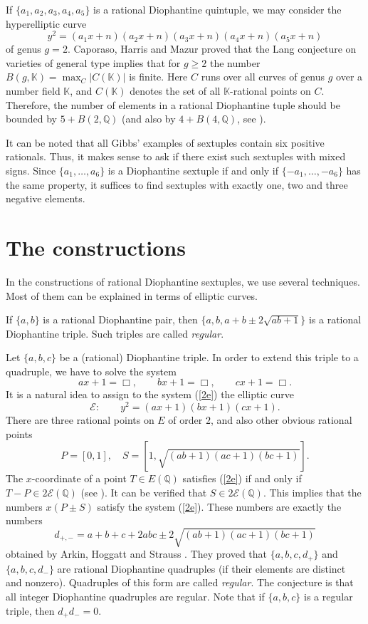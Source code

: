 \documentclass [11pt] {article}
\begin{document}
If $\{a_1,a_2,a_3,a_4,a_5\}$ is a rational Diophantine quintuple, we may consider the hyperelliptic curve
$$ y^2=(a_1x+n)(a_2x+n)(a_3x+n)(a_4x+n)(a_5x+n) $$
of genus $g=2$. Caporaso, Harris and Mazur \cite{C-H-M} proved that
the Lang conjecture on varieties of general type implies that for $g\geq 2$
the number $B(g,\mathbb{K})=\max_{C} |C(\mathbb{K})|$ is finite. Here $C$ runs over all
curves of genus $g$ over a number field $\mathbb{K}$, and $C(\mathbb{K})$ denotes the set of
all $\mathbb{K}$-rational points on $C$. Therefore, the number of elements in a rational
Diophantine tuple should be bounded by $5+B(2,\mathbb{Q})$
(and also by $4+B(4,\mathbb{Q})$, see \cite{P-H-Z}).

\medskip

It can be noted that all Gibbs' examples of sextuples contain six positive rationals.
Thus, it makes sense to ask if there exist such sextuples with mixed signs. Since
$\{a_1, \ldots, a_6\}$ is a Diophantine sextuple if and only if $\{-a_1, \ldots, -a_6\}$ has
the same property, it suffices to find sextuples with exactly one, two and three negative elements.


\section{The constructions}

In the constructions of rational Diophantine sextuples, we use several
techniques. Most of them can be explained in terms of elliptic curves.

If $\{a,b\}$ is a rational Diophantine pair,
then $\{a,b,a+b\pm 2\sqrt{ab+1}\}$ is a rational Diophantine triple.
Such triples are called \emph{regular}.

Let $\{a,b,c\}$ be a (rational) Diophantine triple. In order to extend
this triple to a quadruple, we have to solve the system
\begin{equation} \label{2e}
ax+1=\Box,\qquad bx+1=\Box,\qquad cx+1=\Box.
\end{equation}
It is a natural idea to assign to the system (\ref{2e}) the elliptic curve
\begin{equation} \label{3e}
 \mathcal{E}: \qquad y^2=(ax+1)(bx+1)(cx+1).
\end{equation}
There are three rational points on $E$ of order $2$, and also other obvious rational points
$$ P=[0,1], \quad S=[1, \sqrt{(ab+1)(ac+1)(bc+1)} ]. $$
The $x$-coordinate of a point $T\in E(\mathbb{Q})$ satisfies (\ref{2e}) if and only if
$T-P\in 2\mathcal{E}(\mathbb{Q})$ (see \cite{D-rim}).
It can be verified that $S\in 2\mathcal{E}(\mathbb{Q})$.
This implies that
the numbers $x(P\pm S)$ satisfy the system (\ref{2e}).
These numbers are exactly the numbers
$$ d_{+,-}=a+b+c+2abc\pm 2 \sqrt{(ab+1)(ac+1)(bc+1)} $$
obtained by
Arkin, Hoggatt and Strauss \cite{A-H-S}. They proved that $\{a,b,c,d_{+}\}$ and $\{a,b,c,d_{-}\}$ are
rational Diophantine quadruples (if their elements are distinct and nonzero).
Quadruples of this form are called \emph{regular}. The conjecture is that
all integer Diophantine quadruples are regular.
Note that if $\{a,b,c\}$ is a regular triple, then $d_{+}d_{-}=0$.
\end{document}
